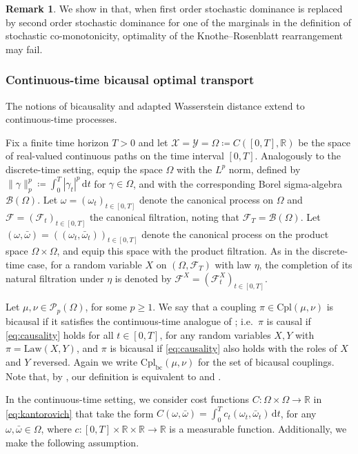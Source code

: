 \documentclass[onseside, final]{amsart}
\theoremstyle{definition}
\newtheorem{remark}[theorem]{Remark}
\newcommand{\F}{\mathcal F}
\newcommand{\X}{\mathcal X}
\newcommand{\Y}{\mathcal Y}
\newcommand{\B}{\mathcal B}
\newcommand{\Pc}{\mathcal P}
\newcommand{\R}{\mathbb R}
\newcommand{\Law}{\mathrm{Law}}
\newcommand{\D}{\,\mathrm{d}}
\newcommand{\cpl}{\mathrm{Cpl}}
\newcommand{\cplba}{\cpl_{\mathrm{bc}}}
\numberwithin{equation}{section}
\begin{document}
			\begin{remark}
				We show in  that, when first order stochastic dominance is replaced by second order stochastic dominance for one of the marginals in the definition of stochastic co-monotonicity, optimality of the Knothe--Rosenblatt rearrangement may fail.
			\end{remark}
		
		\subsubsection{Continuous-time bicausal optimal transport}
			The notions of bicausality and adapted Wasserstein distance extend to continuous-time processes.
			
			Fix a finite time horizon $T > 0$ and let $\X = \Y = \Omega \coloneqq C([0, T], \R)$ be the space of real-valued continuous paths on the time interval $[0, T]$. Analogously to the discrete-time setting, equip the space $\Omega$ with the $L^p$ norm, defined by $\|\gamma\|_p^p \coloneqq \int_0^T|\gamma_t|^p \D t$ for $\gamma\in \Omega$, and with the corresponding Borel sigma-algebra $\B(\Omega)$. Let $\omega = (\omega_t)_{t \in [0, T]}$ denote the canonical process on $\Omega$ and $\F = (\F_t)_{t \in [0, T]}$ the canonical filtration, noting that $\F_T = \B(\Omega)$. Let $(\omega, \bar \omega) = ((\omega_t, \bar \omega_t))_{t \in [0, T]}$ denote the canonical process on the product space $\Omega \times \Omega$, and equip this space with the product filtration. As in the discrete-time case, for a random variable $X$ on $(\Omega, \F_T)$ with law $\eta$, the completion of its natural filtration under $\eta$ is denoted by $\F^X = (\F^X_t)_{t \in [0, T]}$.
			
			Let $\mu, \nu \in \Pc_p(\Omega)$, for some $p \geq 1$. We say that a coupling $\pi \in \cpl(\mu, \nu)$ is bicausal if it satisfies the continuous-time analogue of ; i.e.~$\pi$ is causal if \eqref{eq:causality} holds for all $t \in [0, T]$, for any random variables $X, Y$ with $\pi = \Law(X, Y)$, and $\pi$ is bicausal if \eqref{eq:causality} also holds with the roles of $X$ and $Y$ reversed. Again we write $\cplba(\mu, \nu)$ for the set of bicausal couplings. Note that, by \citep[Example 1(v), Lemma 4, and Proposition 2]{La18}, our definition is equivalent to \citet[Definition 1.2]{BaBaBeEd19a} and \citet[Definition 1]{La18}.
			
			In the continuous-time setting, we consider cost functions $C \colon \Omega \times \Omega \to \R$ in \eqref{eq:kantorovich} that take the form $C(\omega, \bar \omega) = \int_0^T c_t(\omega_t, \bar \omega_t) \D t$, for any $\omega, \bar \omega \in \Omega$, where $c \colon [0, T] \times \R \times \R \to \R$ is a measurable function. Additionally, we make the following assumption.
			
\end{document}
